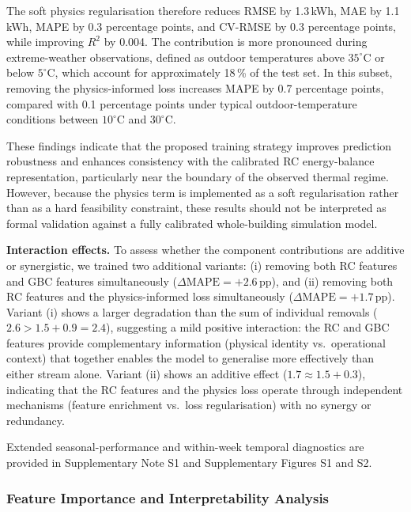 \documentclass[11pt]{article}
\providecommand{\pp}{\,\text{pp}}
\providecommand{\MAPE}{\text{MAPE}}
\begin{document}
The soft physics regularisation therefore reduces RMSE by 1.3\,kWh, MAE by 1.1\,kWh, MAPE by 0.3 percentage points, and CV-RMSE by 0.3 percentage points, while improving $R^2$ by 0.004. The contribution is more pronounced during extreme-weather observations, defined as outdoor temperatures above $35^\circ\text{C}$ or below $5^\circ\text{C}$, which account for approximately 18\,\% of the test set. In this subset, removing the physics-informed loss increases MAPE by 0.7 percentage points, compared with 0.1 percentage points under typical outdoor-temperature conditions between $10^\circ\text{C}$ and $30^\circ\text{C}$.

These findings indicate that the proposed training strategy improves prediction robustness and enhances consistency with the calibrated RC energy-balance representation, particularly near the boundary of the observed thermal regime. However, because the physics term is implemented as a soft regularisation rather than as a hard feasibility constraint, these results should not be interpreted as formal validation against a fully calibrated whole-building simulation model.

\par\noindent\hspace*{2em}\textbf{Interaction effects.}
To assess whether the component contributions are additive or synergistic, we trained two additional variants: (i) removing both RC features and GBC features simultaneously ($\Delta\MAPE=+2.6\pp$), and (ii) removing both RC features and the physics-informed loss simultaneously ($\Delta\MAPE=+1.7\pp$). Variant (i) shows a larger degradation than the sum of individual removals ($2.6>1.5+0.9=2.4$), suggesting a mild positive interaction: the RC and GBC features provide complementary information (physical identity vs.\ operational context) that together enables the model to generalise more effectively than either stream alone. Variant (ii) shows an additive effect ($1.7\approx1.5+0.3$), indicating that the RC features and the physics loss operate through independent mechanisms (feature enrichment vs.\ loss regularisation) with no synergy or redundancy.

Extended seasonal-performance and within-week temporal diagnostics are provided in Supplementary Note S1 and Supplementary Figures S1 and S2.

\subsubsection{Feature Importance and Interpretability Analysis}
\end{document}
